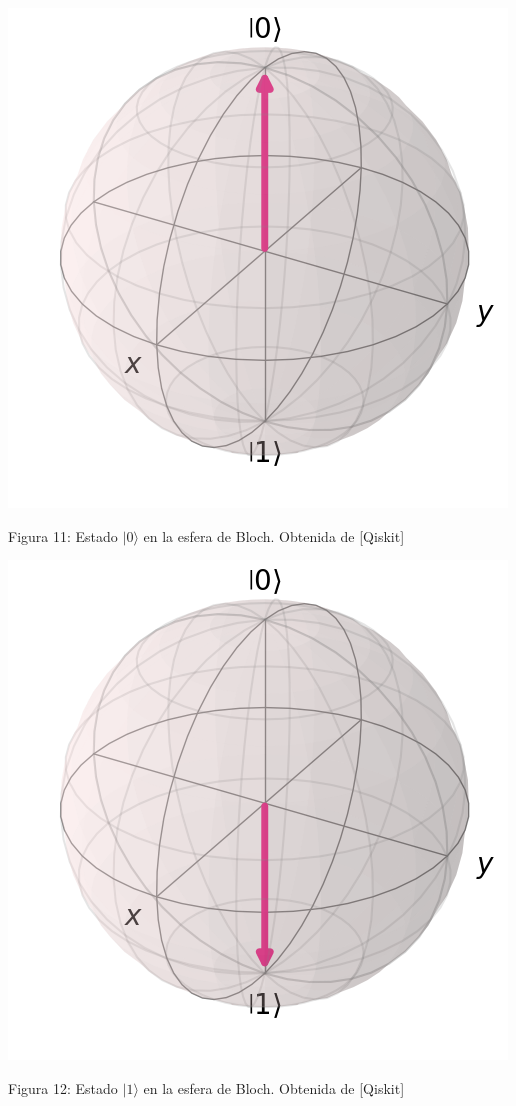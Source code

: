 \documentclass[12pt]{article}
\numberwithin{equation}{section} %
\begin{document}
    \begin{minipage}{0.1\textwidth}
        \hfill
    \end{minipage}
    \begin{minipage}{0.3\textwidth}
        \centering
        \includegraphics[width=\textwidth]{img/Bloch/bloch_state_0.png}
        \caption{Figura 11: Estado $|0\rangle$ en la esfera de Bloch. Obtenida de [Qiskit]}
    \end{minipage}
    \hfill
    \hfill
    \begin{minipage}{0.3\textwidth}
        \centering
        \includegraphics[width=\textwidth]{img/Bloch/bloch_state_1.png}
        \caption{Figura 12: Estado $|1\rangle$ en la esfera de Bloch. Obtenida de [Qiskit]}
    \end{minipage}
\end{document}
